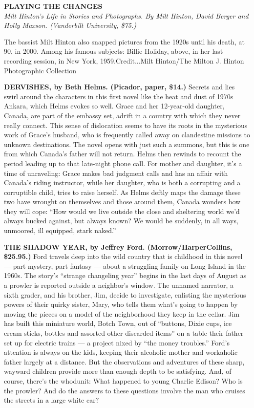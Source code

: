 \textbf{PLAYING THE CHANGES}\\
\emph{Milt Hinton's Life in Stories and Photographs. By Milt Hinton,
David Berger and Holly Maxson. (Vanderbilt University, \$75.)}

The bassist Milt Hinton also snapped pictures from the 1920s until his
death, at 90, in 2000. Among his famous subjects: Billie Holiday, above,
in her last recording session, in New York, 1959.Credit...Milt
Hinton/The Milton J. Hinton Photographic Collection

\textbf{DERVISHES, by Beth Helms. (Picador, paper, \$14.)} Secrets and
lies swirl around the characters in this first novel like the heat and
dust of 1970s Ankara, which Helms evokes so well. Grace and her
12-year-old daughter, Canada, are part of the embassy set, adrift in a
country with which they never really connect. This sense of dislocation
seems to have its roots in the mysterious work of Grace's husband, who
is frequently called away on clandestine missions to unknown
destinations. The novel opens with just such a summons, but this is one
from which Canada's father will not return. Helms then rewinds to
recount the period leading up to that late-night phone call. For mother
and daughter, it's a time of unraveling: Grace makes bad judgment calls
and has an affair with Canada's riding instructor, while her daughter,
who is both a corrupting and a corruptible child, tries to raise
herself. As Helms deftly maps the damage these two have wrought on
themselves and those around them, Canada wonders how they will cope:
``How would we live outside the close and sheltering world we'd always
bucked against, but always known? We would be suddenly, in all ways,
unmoored, ill equipped, stark naked.''

\textbf{THE SHADOW YEAR, by Jeffrey Ford. (Morrow/HarperCollins,
\$25.95.)} Ford travels deep into the wild country that is childhood in
this novel --- part mystery, part fantasy --- about a struggling family
on Long Island in the 1960s. The story's ``strange changeling year''
begins in the last days of August as a prowler is reported outside a
neighbor's window. The unnamed narrator, a sixth grader, and his
brother, Jim, decide to investigate, enlisting the mysterious powers of
their quirky sister, Mary, who tells them what's going to happen by
moving the pieces on a model of the neighborhood they keep in the
cellar. Jim has built this miniature world, Botch Town, out of
``buttons, Dixie cups, ice cream sticks, bottles and assorted other
discarded items'' on a table their father set up for electric trains ---
a project nixed by ``the money troubles.'' Ford's attention is always on
the kids, keeping their alcoholic mother and workaholic father largely
at a distance. But the observations and adventures of these sharp,
wayward children provide more than enough depth to be satisfying. And,
of course, there's the whodunit: What happened to young Charlie Edison?
Who is the prowler? And do the answers to these questions involve the
man who cruises the streets in a large white car?

